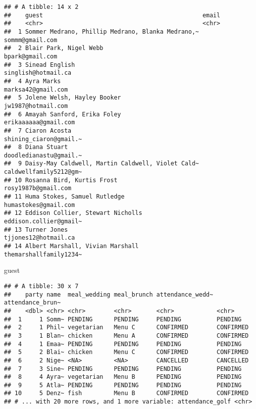 \documentclass[]{article}
\newenvironment{Shaded}{\begin{snugshade}}{\end{snugshade}}
\newcommand{\NormalTok}[1]{#1}
\begin{document}
\begin{verbatim}
## # A tibble: 14 x 2
##    guest                                             email                 
##    <chr>                                             <chr>                 
##  1 Sommer Medrano, Phillip Medrano, Blanka Medrano,~ sommm@gmail.com       
##  2 Blair Park, Nigel Webb                            bpark@gmail.com       
##  3 Sinead English                                    singlish@hotmail.ca   
##  4 Ayra Marks                                        marksa42@gmail.com    
##  5 Jolene Welsh, Hayley Booker                       jw1987@hotmail.com    
##  6 Amayah Sanford, Erika Foley                       erikaaaaaa@gmail.com  
##  7 Ciaron Acosta                                     shining_ciaron@gmail.~
##  8 Diana Stuart                                      doodledianastu@gmail.~
##  9 Daisy-May Caldwell, Martin Caldwell, Violet Cald~ caldwellfamily5212@gm~
## 10 Rosanna Bird, Kurtis Frost                        rosy1987b@gmail.com   
## 11 Huma Stokes, Samuel Rutledge                      humastokes@gmail.com  
## 12 Eddison Collier, Stewart Nicholls                 eddison.collier@gmail~
## 13 Turner Jones                                      tjjones12@hotmail.ca  
## 14 Albert Marshall, Vivian Marshall                  themarshallfamily1234~
\end{verbatim}

\begin{Shaded}
\begin{Highlighting}[]
\NormalTok{guest}
\end{Highlighting}
\end{Shaded}

\begin{verbatim}
## # A tibble: 30 x 7
##    party name  meal_wedding meal_brunch attendance_wedd~ attendance_brun~
##    <dbl> <chr> <chr>        <chr>       <chr>            <chr>           
##  1     1 Somm~ PENDING      PENDING     PENDING          PENDING         
##  2     1 Phil~ vegetarian   Menu C      CONFIRMED        CONFIRMED       
##  3     1 Blan~ chicken      Menu A      CONFIRMED        CONFIRMED       
##  4     1 Emaa~ PENDING      PENDING     PENDING          PENDING         
##  5     2 Blai~ chicken      Menu C      CONFIRMED        CONFIRMED       
##  6     2 Nige~ <NA>         <NA>        CANCELLED        CANCELLED       
##  7     3 Sine~ PENDING      PENDING     PENDING          PENDING         
##  8     4 Ayra~ vegetarian   Menu B      PENDING          PENDING         
##  9     5 Atla~ PENDING      PENDING     PENDING          PENDING         
## 10     5 Denz~ fish         Menu B      CONFIRMED        CONFIRMED       
## # ... with 20 more rows, and 1 more variable: attendance_golf <chr>
\end{verbatim}
\end{document}
